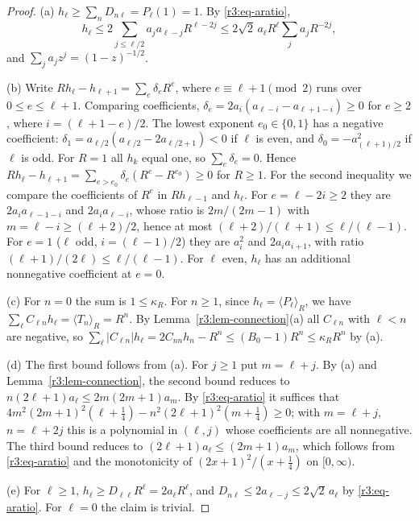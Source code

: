 \documentclass[11pt]{amsart}
\theoremstyle{definition}
\theoremstyle{remark}
\numberwithin{equation}{section}
\begin{document}
\begin{proof}
(a) $h_\ell\geq\sum_nD_{n\ell}=P_\ell(1)=1$. By \eqref{r3:eq-aratio},
\[
h_\ell\leq2\sum_{j\leq\ell/2}a_ja_{\ell-j}R^{\ell-2j}\leq2\sqrt2\,a_\ell R^\ell\sum_ja_jR^{-2j},
\]
and $\sum_ja_jz^j=(1-z)^{-1/2}$.

(b) Write $Rh_\ell-h_{\ell+1}=\sum_e\delta_eR^e$, where $e\equiv\ell+1\pmod2$ runs over $0\leq e\leq\ell+1$. Comparing coefficients, $\delta_e=2a_i(a_{\ell-i}-a_{\ell+1-i})\geq0$ for $e\geq2$, where $i=(\ell+1-e)/2$. The lowest exponent $e_0\in\{0,1\}$ has a negative coefficient: $\delta_1=a_{\ell/2}(a_{\ell/2}-2a_{\ell/2+1})<0$ if $\ell$ is even, and $\delta_0=-a_{(\ell+1)/2}^2$ if $\ell$ is odd. For $R=1$ all $h_k$ equal one, so $\sum_e\delta_e=0$. Hence $Rh_\ell-h_{\ell+1}=\sum_{e>e_0}\delta_e(R^e-R^{e_0})\geq0$ for $R\geq1$. For the second inequality we compare the coefficients of $R^e$ in $Rh_{\ell-1}$ and $h_\ell$. For $e=\ell-2i\geq2$ they are $2a_ia_{\ell-1-i}$ and $2a_ia_{\ell-i}$, whose ratio is $2m/(2m-1)$ with $m=\ell-i\geq(\ell+2)/2$, hence at most $(\ell+2)/(\ell+1)\leq\ell/(\ell-1)$. For $e=1$ ($\ell$ odd, $i=(\ell-1)/2$) they are $a_i^2$ and $2a_ia_{i+1}$, with ratio $(\ell+1)/(2\ell)\leq\ell/(\ell-1)$. For $\ell$ even, $h_\ell$ has an additional nonnegative coefficient at $e=0$.

(c) For $n=0$ the sum is $1\leq\kappa_R$. For $n\geq1$, since $h_\ell=\langle P_\ell\rangle_R$, we have $\sum_\ell C_{\ell n}h_\ell=\langle T_n\rangle_R=R^n$. By Lemma~\ref{r3:lem-connection}(a) all $C_{\ell n}$ with $\ell<n$ are negative, so $\sum_\ell|C_{\ell n}|h_\ell=2C_{nn}h_n-R^n\leq(B_0-1)R^n\leq\kappa_RR^n$ by (a).

(d) The first bound follows from (a). For $j\geq1$ put $m=\ell+j$. By (a) and Lemma~\ref{r3:lem-connection}, the second bound reduces to $n(2\ell+1)a_\ell\leq2m(2m+1)a_m$. By \eqref{r3:eq-aratio} it suffices that $4m^2(2m+1)^2(\ell+\frac14)-n^2(2\ell+1)^2(m+\frac14)\geq0$; with $m=\ell+j$, $n=\ell+2j$ this is a polynomial in $(\ell,j)$ whose coefficients are all nonnegative. The third bound reduces to $(2\ell+1)a_\ell\leq(2m+1)a_m$, which follows from \eqref{r3:eq-aratio} and the monotonicity of $(2x+1)^2/(x+\frac14)$ on $[0,\infty)$.

(e) For $\ell\geq1$, $h_\ell\geq D_{\ell\ell}R^\ell=2a_\ell R^\ell$, and $D_{n\ell}\leq2a_{\ell-j}\leq2\sqrt2\,a_\ell$ by \eqref{r3:eq-aratio}. For $\ell=0$ the claim is trivial.
\end{proof}
\end{document}
